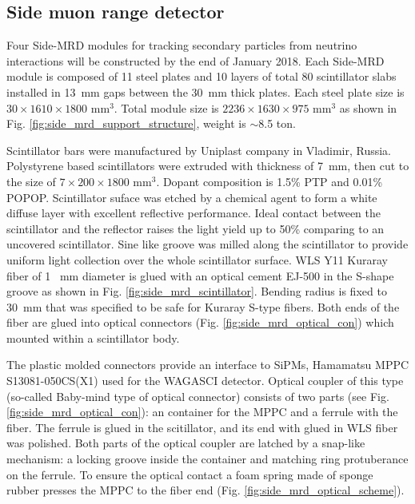\subsection{Side muon range detector}
Four Side-MRD modules for tracking secondary particles from neutrino interactions will be constructed by the end of January 2018. 
Each Side-MRD module is composed of 11  steel plates and 10 layers of total 80 scintillator slabs installed  in 13~mm gaps between the 30~mm thick plates. Each steel plate size is  $30\times1610\times1800$ mm$^{3}$. Total module size  is  $2236\times1630\times975$ mm$^{3}$ as shown in Fig. \ref{fig:side_mrd_support_structure}, weight is $\sim$8.5 ton. 

Scintillator bars were manufactured by Uniplast company in Vladimir, Russia. Polystyrene based scintillators were extruded with thickness of 7~mm, then cut to the size of $7\times200\times1800$ mm$^{3}$. Dopant composition is  1.5\% PTP and 0.01\% POPOP.
Scintillator suface was etched by a chemical agent to form a white diffuse layer with excellent reflective performance. 
Ideal contact between the scintillator and the reflector raises the light yield up to 50\% comparing to an uncovered scintillator. 
Sine like groove was milled along the scintillator to provide uniform light collection over the whole scintillator surface. 
WLS Y11 Kuraray fiber of 1 ~mm diameter is glued with an optical cement EJ-500 in the S-shape groove  as shown in Fig. \ref{fig:side_mrd_scintillator}. Bending radius is fixed to  30~mm that was specified to be safe for Kuraray S-type fibers.
Both ends of the fiber are glued into optical connectors (Fig. \ref{fig:side_mrd_optical_con}) which mounted within a scintillator body.

The plastic molded connectors provide an interface to SiPMs, Hamamatsu  MPPC S13081-050CS(X1) used for the WAGASCI detector. 
Optical coupler of this type (so-called Baby-mind type of optical connector) consists of two parts (see Fig. \ref{fig:side_mrd_optical_con}):  an container for the MPPC  and  a ferrule with the fiber.  The ferrule  is glued in the scitillator, and its end with glued in WLS fiber was polished. 
Both parts of the optical coupler are latched by a snap-like mechanism: a locking groove inside the container and matching ring protuberance
on the ferrule.  To ensure the optical contact a foam spring made of sponge rubber presses the MPPC to the fiber end (Fig. \ref{fig:side_mrd_optical_scheme}). 

